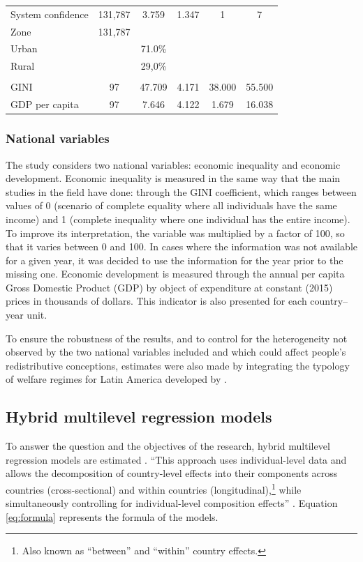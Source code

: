 \documentclass[utf8]{frontiersSCNS} %
\begin{document}
\begin{table}
\begin{tabular}{lccccc}
System confidence & 131,787 & 3.759 & 1.347 & 1 & 7 \\
Zone & 131,787 &  &  &  &  \\
\hspace{3mm}Urban & & 71.0\% & & & \\
\hspace{3mm}Rural & & 29,0\% & & & \\
\hline \\[-1.8ex]
GINI & 97 & 47.709 & 4.171 & 38.000 & 55.500 \\
GDP  per capita & 97 & 7.646 & 4.122 & 1.679 & 16.038 \\
\bottomrule
\end{tabular}
\end{table}

\subsubsection{National variables}

The study considers two national variables: economic inequality and economic development. Economic inequality is measured in the same way that the main studies in the field have done: through the GINI coefficient, which ranges between values of 0 (scenario of complete equality where all individuals have the same income) and 1 (complete inequality where one individual has the entire income). To improve its interpretation, the variable was multiplied by a factor of 100, so that it varies between 0 and 100. In cases where the information was not available for a given year, it was decided to use the information for the year prior to the missing one. Economic development is measured through the annual per capita Gross Domestic Product (GDP) by object of expenditure at constant (2015) prices in thousands of dollars. This indicator is also presented for each country–year unit.

To ensure the robustness of the results, and to control for the heterogeneity not observed by the two national variables included and which could affect people’s redistributive conceptions, estimates were also made by integrating the typology of welfare regimes for Latin America developed by \textcite{MartinezFranzoniWelfareRegimesLatin2008}.

\subsection{Hybrid multilevel regression models}

To answer the question and the objectives of the research, hybrid multilevel regression models are estimated \parencite{FairbrotherTwoMultilevelModeling2014}. “This approach uses individual-level data and allows the decomposition of country-level effects into their components across countries (cross-sectional) and within countries (longitudinal),\footnote{Also known as “between” and “within” country effects.}  while simultaneously controlling for individual-level composition effects” \parencite[p.~3]{Schmidt-CatranEconomicinequalitypublic2016}. Equation \ref{eq:formula} represents the formula of the models.
\end{document}
